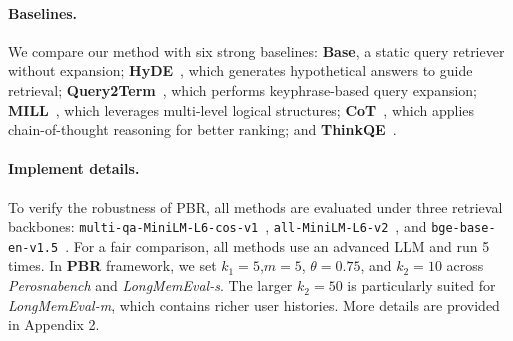 \paragraph{Baselines.}
We compare our method with six strong baselines: \textbf{Base}, a static query retriever without expansion; \textbf{HyDE}~\cite{gao2023precise}, which generates hypothetical answers to guide retrieval; \textbf{Query2Term}~\cite{jagerman2023query}, which performs keyphrase-based query expansion; \textbf{MILL}~\cite{jia2023mill}, which leverages multi-level logical structures; \textbf{CoT}~\cite{wei2022chain}, which applies chain-of-thought reasoning for better ranking; and \textbf{ThinkQE}~\cite{lei2025thinkqe}. 

\paragraph{Implement details.}
To verify the robustness of PBR, all methods are evaluated under three retrieval backbones: \texttt{multi-qa-MiniLM-L6-cos-v1}~\cite{wang2020minilm}, \texttt{all-MiniLM-L6-v2}~\cite{wang2020minilm}, and \texttt{bge-base-en-v1.5}~\cite{chen2024bge}. For a fair comparison, all methods use an advanced LLM and run 5 times. In \textbf{PBR} framework, we set $k_1=5$,$m=5$, $\theta=0.75$, and $k_2=10$ across \textit{Perosnabench} and \textit{LongMemEval-s}. The larger $k_2=50$ is particularly suited for \textit{LongMemEval-m}, which contains richer user histories. More details are provided in Appendix 2.


